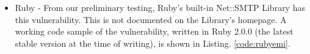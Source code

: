 \begin{itemize}
	\item Ruby - From our preliminary testing, Ruby's built-in Net::SMTP Library has this vulnerability. This is not documented on the Library's homepage.
	A working code sample of the vulnerability, written in Ruby 2.0.0 (the latest stable version at the time of writing), is shown in Listing. \ref{code:rubyemi}.
	
	
	
\end{itemize}
